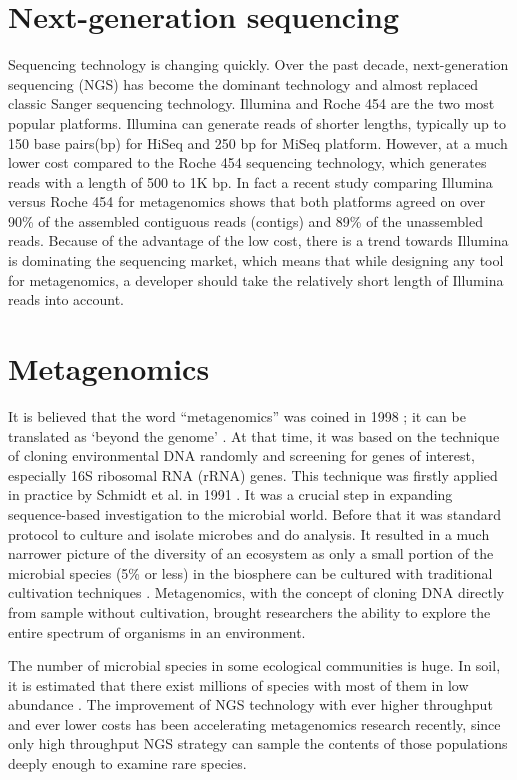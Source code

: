 \section{Next-generation sequencing} Sequencing technology is changing quickly.
Over the past decade, next-generation sequencing (NGS) has become the dominant
technology and almost replaced classic Sanger sequencing technology. Illumina
and Roche 454 are the two most popular platforms. Illumina can generate reads
of shorter lengths, typically up to 150 base pairs(bp) for HiSeq and 250 bp for MiSeq
platform\cite{Qin:2010aa, Mason:2012aa}.   %
However, at a much lower cost compared to the Roche 454 sequencing
technology, which generates reads with a length of 500 to 1K bp. In fact a
recent study comparing Illumina versus Roche 454 for metagenomics shows that
both platforms agreed on over 90\% of the assembled contiguous reads (contigs)
and 89\% of the unassembled reads\cite{Luo:2012aa}. Because of the advantage of
the low cost, there is a trend towards Illumina is dominating the sequencing
market, which means that while designing any tool for metagenomics, a developer
should take the relatively short length of Illumina reads into account.


\section{Metagenomics} 
It is believed that the word ``metagenomics'' was coined
in 1998 \cite{Handelsman:1998aa}; it can be translated as `beyond the genome'
\cite{Gilbert:2011aa}. At that time, it was based on the technique of cloning
environmental DNA randomly and screening for genes of interest, especially 16S
ribosomal RNA (rRNA) genes. This technique was firstly applied in practice by
Schmidt et al. in 1991 \cite{Schmidt:1991aa}. It was a crucial step in
expanding sequence-based investigation to the microbial world. Before that it
was standard protocol to culture and isolate microbes and do analysis. It
resulted in a much narrower picture of the diversity of an ecosystem as only a
small portion of the microbial species (5\% or less) in the biosphere can be
cultured with traditional cultivation techniques \cite{Sogin:2006aa}.
Metagenomics, with the concept of cloning DNA directly from sample 
without cultivation, brought researchers the ability to explore the entire
spectrum of organisms in an environment.

The number of microbial species in some ecological communities is huge. In soil,
it is estimated that there exist millions of species with most of them in low
abundance \cite{Gans:2005aa}. The improvement of NGS technology with ever higher throughput and ever lower
costs has been accelerating metagenomics research recently, %
since only high throughput NGS strategy can sample the
contents of those populations deeply enough to examine rare species.

